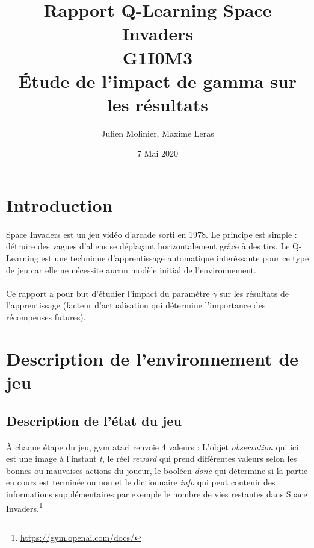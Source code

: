 \documentclass[12pt,oneside,a4paper]{article}
\begin{document}
\title{Rapport Q-Learning Space Invaders \\ G1I0M3 \\ Étude de l'impact de gamma sur les résultats}

\author{Julien Molinier, Maxime Leras}
\date{7 Mai 2020}
\maketitle\thispagestyle{empty}

\newpage    
\clearpage
\thispagestyle{empty}
\renewcommand*\contentsname{Sommaire}
\tableofcontents
\newpage

\pagestyle{fancy}
\cfoot{\thepage}
\fancyhead{}
\fancyhead[R]{\leftmark}

\section{Introduction}
\paragraph{}
    Space Invaders est un jeu vidéo d'arcade sorti en 1978. Le principe
    est simple : détruire des vagues d'aliens se déplaçant horizontalement
    grâce à des tirs.
    Le Q-Learning est une technique d'apprentissage automatique
    interéssante pour ce type de jeu car elle ne nécessite aucun modèle 
    initial de l'environnement.
\paragraph{}
    Ce rapport a pour but d'étudier l'impact du paramètre $\gamma$ sur 
    les résultats de l'apprentissage (facteur d'actualisation qui détermine 
    l'importance des récompenses futures).

\section{Description de l'environnement de jeu}
\subsection{Description de l'état du jeu}
\paragraph{}
À chaque étape du jeu, gym atari renvoie 4 valeurs : 
L'objet {\it{observation}} qui ici est une image à l'instant {\it{t}}, le réel {\it{reward}} qui
prend différentes valeurs selon les bonnes ou mauvaises actions du joueur,
le booléen {\it{done}} qui détermine si la partie en cours est terminée ou non et
le dictionnaire {\it{info}} qui peut contenir des informations supplémentaires
par exemple le nombre de vies restantes dans Space Invaders.\footnote{\url{https://gym.openai.com/docs/}}
\end{document}
